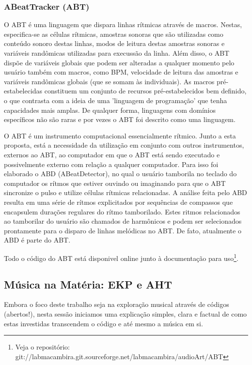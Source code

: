 \subsubsection{ABeatTracker (ABT)}

O ABT é uma linguagem que dispara linhas rítmicas através
de macros. Nestas, especifica-se as células rítmicas, amostras sonoras que
são utilizadas como conteúdo sonoro destas linhas, modos de leitura
destas amostras sonoras e variáveis randômicas utilizadas para
execussão da linha. Além disso, o ABT dispõe de variáveis globais que
podem ser alteradas a qualquer momento pelo usuário também com macros, como BPM,
velocidade de leitura das amostras e variáveis randômicas globais (que
se somam às individuais).
As macros
pré-estabelecidas constituem um conjunto de recursos pré-estabelecidos
bem definido, o que contrasta com a ideia de uma 'linguagem de
programação' que tenha capacidades mais amplas. De qualquer forma,
linguagens com domínios específicos não são raras e por vezes o ABT
foi descrito como uma linguagem.

O ABT é um instrumento computacional essencialmente rítmico. Junto a esta
proposta, está a necessidade da utilização em conjunto com outros
instrumentos, externos ao ABT, ao computador em que o ABT está sendo executado
e possivelmente externo com relação a qualquer computador. Para isso
foi elaborado o ABD (ABeatDetector), no qual o usuário tamborila no
teclado do computador os rítmos que estiver ouvindo ou imaginando para
que o ABT sincronize o pulso e utilize células rítmicas
relacionadas. A análise feita pelo ABD resulta em uma série de rítmos
explicitados por sequências de compassos que encapsulem durações
regulares do rítmo tamborilado. Estes ritmos relacionados ao
tamborilar do usuário são chamados de harmônicos e podem ser
selecionados prontamente para o disparo de linhas melódicas no ABT.
De fato, atualmente o ABD é parte do ABT.

Todo o código do
ABT está disponivel online junto à documentação para uso\footnote{Veja o
repositório: git://labmacambira.git.sourceforge.net/labmacambira/audioArt/ABT}.


\subsection{Música na Matéria: EKP e AHT}
\label{aht}

Embora o foco deste trabalho seja na exploração musical através de
códigos (abertos!), nesta sessão iniciamos uma explicação simples,
clara e factual de como estas investidas transcendem o código e até
mesmo a música em si.

